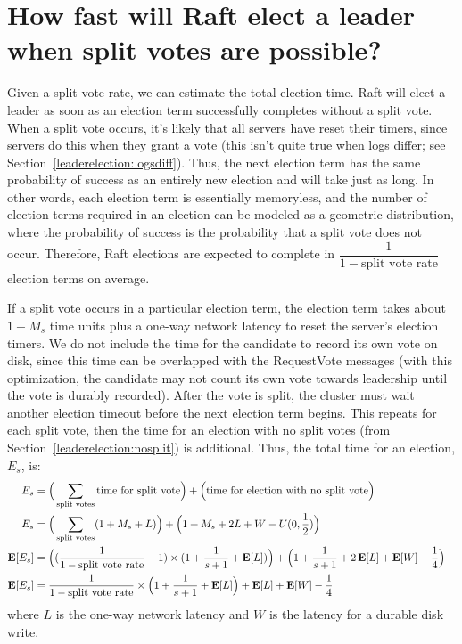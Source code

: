 \section{How fast will Raft elect a leader when split votes are possible?}
\label{leaderelection:split:total}

Given a split vote rate, we can estimate the total election time.
Raft will elect a leader as soon as an election term
successfully completes without a split vote. When a split vote occurs,
it's likely that all servers have reset their timers, since servers do
this when they grant a vote (this isn't quite true when logs
differ; see Section~\ref{leaderelection:logsdiff}). Thus, the
next election term has the same probability of success as an entirely
new election and will take just as long. In other words, each election
term is essentially memoryless, and the number of election terms
required in an election can be modeled as a geometric distribution,
where the probability of success is the probability that a split vote
does not occur. Therefore, Raft elections are expected to complete in
$\dfrac{1}{1-\text{split vote rate}}$ election terms on average.

If a split vote occurs in a particular election term, the election term
takes about $1+M_s$ time units plus a one-way network latency to reset
the server's election timers. We do not include the time for the
candidate to record its own vote on disk, since this time can be
overlapped with the RequestVote messages (with this optimization, the
candidate may not count its own vote towards leadership until the vote
is durably recorded). After the vote is split, the cluster must wait
another election timeout before the next election term begins. This
repeats for each split vote, then the time for an election with no split
votes (from Section~\ref{leaderelection:nosplit}) is additional. Thus, the
total time for an election, $E_s$, is:
\begin{align*}
E_s &= \Big(\sum_\text{split votes} \text{time for split vote}\Big)
 +
  \Big(\text{time for election with no split vote}\Big) \\
%
E_s &= \Big(\sum_\text{split votes} (1 + M_s + L)\Big)
 +
  \Big(1 + M_s + 2L + W - U(0,\dfrac{1}{2})\Big) & \\
%
\Ex[E_s] &= \Big((\frac{1}{1-\text{split vote rate}} - 1) \times
            (1 + \frac{1}{s+1} + \Ex[L])\Big)
 +
  \Big(1 + \frac{1}{s+1} + 2\Ex[L] + \Ex[W] - \dfrac{1}{4}\Big) \\
%
\Ex[E_s] &= \frac{1}{1-\text{split vote rate}} \times
            \Big(1 + \frac{1}{s+1} + \Ex[L]\Big)
            + \Ex[L] + \Ex[W] - \dfrac{1}{4}
\end{align*}
where $L$ is the one-way network latency and $W$ is the latency for a
durable disk write.

